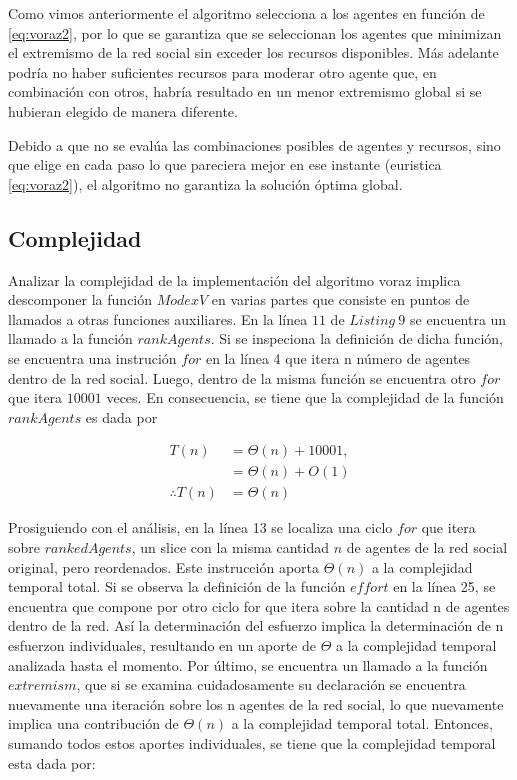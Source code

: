 \documentclass[letterpaper,10pt]{article}
\begin{document}
Como vimos anteriormente el algoritmo selecciona a los agentes en función de \eqref{eq:voraz2}, por lo que se garantiza que se seleccionan los agentes que minimizan el extremismo de la red social sin exceder los recursos disponibles. Más adelante podría no haber suficientes recursos para moderar otro agente que, en combinación con otros, habría resultado en un menor extremismo global si se hubieran elegido de manera diferente.

Debido a que no se evalúa las combinaciones posibles de agentes y recursos, sino que elige en cada paso lo que pareciera mejor en ese instante (euristica \eqref{eq:voraz2}), el algoritmo no garantiza la solución óptima global.

\subsection{Complejidad}
\label{subsec:complejidad_algoritmo_voraz}
Analizar la complejidad de la implementación del algoritmo voraz implica descomponer la función $ModexV$ en varias partes que consiste en puntos de llamados a otras funciones auxiliares. En la línea $11$ de $Listing~9$ se encuentra un llamado a la función $rankAgents$. Si se inspeciona la definición de dicha función, se encuentra una instrución $for$ en la línea 4 que itera n número de agentes dentro de la red social. Luego, dentro de la misma función se encuentra otro $for$ que itera $10001$ veces. En consecuencia, se tiene que la complejidad de la función $rankAgents$ es dada por

\begin{align*}
  T(n) &= \Theta(n) + 10001,\\
  &= \Theta(n) + O(1)\\
  \therefore T(n) &= \Theta(n)
\end{align*}

Prosiguiendo con el análisis, en la línea 13 se localiza una ciclo $for$ que itera sobre $rankedAgents$, un slice con la misma cantidad $n$ de agentes de la red social original, pero reordenados. Este instrucción aporta $\Theta(n)$ a la complejidad temporal total. Si se observa la definición de la función $effort$ en la línea 25, se encuentra que compone por otro ciclo for que itera sobre la cantidad n de agentes dentro de la red. Así la determinación del esfuerzo implica la determinación de n esfuerzon individuales, resultando en un aporte de $\Theta$ a la complejidad temporal analizada hasta el momento. Por último, se encuentra un llamado a la función $extremism$, que si se examina cuidadosamente su declaración se encuentra nuevamente una iteración sobre los n agentes de la red social, lo que nuevamente implica una contribución de $\Theta(n)$ a la complejidad temporal total.
Entonces, sumando todos estos aportes individuales, se tiene que la complejidad temporal esta dada por:
\end{document}
